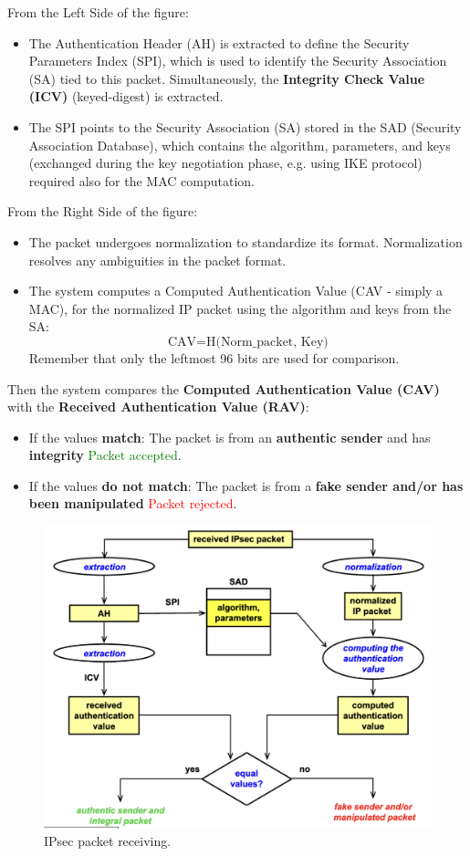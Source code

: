 \begin{multicols}{2}
    \raggedcolumns
From the Left Side of the figure:
    \begin{itemize}
        \item The Authentication Header (AH) is extracted to define the Security Parameters Index (SPI), which is used to identify the Security Association (SA) tied to this packet. Simultaneously, the \textbf{Integrity Check Value (ICV)} (keyed-digest) is extracted.
        \item The SPI points to the Security Association (SA) stored in the SAD (Security Association Database), which contains the algorithm, parameters, and keys (exchanged during the key negotiation phase, e.g. using IKE protocol) required also for the MAC computation.
    \end{itemize}


\columnbreak
From the Right Side of the figure:

    \begin{itemize}
        \item The packet undergoes normalization to standardize its format. Normalization resolves any ambiguities in the packet format.
        \item The system computes a Computed Authentication Value (CAV - simply a MAC), for the normalized IP packet using the algorithm and keys from the SA:
    \[
    \text{CAV} = \text{H(Norm\_packet, Key)}
    \]
    Remember that only the leftmost 96 bits are used for comparison.
    \end{itemize}
\end{multicols}

Then the system compares the \textbf{Computed Authentication Value (CAV)} with the \textbf{Received Authentication Value (RAV)}:
\begin{itemize}
    \item If the values \textbf{match}: The packet is from an \textbf{authentic sender} and has \textbf{integrity} \textrightarrow \textcolor{Green}{Packet accepted}.
    \item If the values \textbf{do not match}: The packet is from a \textbf{fake sender and/or has been manipulated} \textrightarrow \textcolor{Red}{Packet rejected}.
\end{itemize}


\begin{figure}[H]
    \centering
  \includegraphics[width=0.5\linewidth]{Images/NetSec/packet_receiving.png}
  \caption{IPsec packet receiving.}
  \label{fig:ipsec_packet_rec}
\end{figure}


